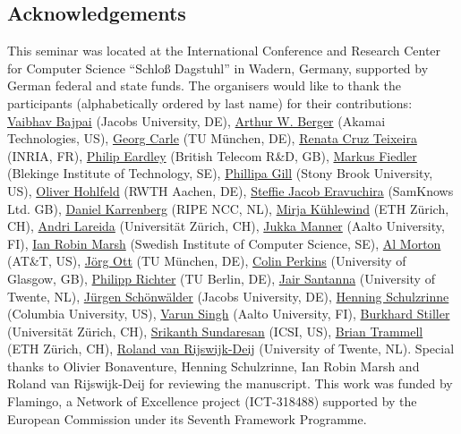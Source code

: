 \subsection*{Acknowledgements}\label{sec:acknowledgement}

This seminar was located at the International Conference and Research Center
for Computer Science ``Schloß Dagstuhl'' in Wadern, Germany, supported by German
federal and state funds. The organisers would like to thank the participants
(alphabetically ordered by last name) for their contributions:
\href{http://dblp.dagstuhl.de/rec/pid/17/11461}{Vaibhav Bajpai} (Jacobs University, DE),
\href{http://dblp.dagstuhl.de/rec/pid/46/4345}{Arthur W. Berger} (Akamai Technologies, US),
\href{http://dblp.dagstuhl.de/rec/pid/c/GeorgCarle}{Georg Carle} (TU München, DE),
\href{http://dblp.dagstuhl.de/rec/pid/64/4885}{Renata Cruz Teixeira} (INRIA, FR),
\href{http://dblp.dagstuhl.de/rec/pid/31/9324}{Philip Eardley} (British Telecom R\&D, GB),
\href{http://dblp.dagstuhl.de/rec/pid/48/4558}{Markus Fiedler} (Blekinge Institute of Technology, SE),
\href{http://dblp.dagstuhl.de/rec/pid/52/2893}{Phillipa Gill} (Stony Brook University, US),
\href{http://dblp.dagstuhl.de/rec/pid/75/6403}{Oliver Hohlfeld} (RWTH Aachen, DE),
\href{http://dblp.dagstuhl.de/rec/pid/165/2478}{Steffie Jacob Eravuchira} (SamKnows Ltd. GB),
\href{http://dblp.dagstuhl.de/rec/pid/85/3339}{Daniel Karrenberg} (RIPE NCC, NL),
\href{http://dblp.dagstuhl.de/rec/pid/50/8423}{Mirja Kühlewind} (ETH Zürich, CH),
\href{http://dblp.dagstuhl.de/rec/pid/133/3745}{Andri Lareida} (Universität Zürich, CH),
\href{http://dblp.dagstuhl.de/rec/pid/09/6049}{Jukka Manner} (Aalto University, FI),
\href{http://dblp.dagstuhl.de/rec/pid/00/1805}{Ian Robin Marsh} (Swedish Institute of Computer Science, SE),
\href{http://dblp.dagstuhl.de/rec/pid/84/7584}{Al Morton} (AT\&T, US),
\href{http://dblp.dagstuhl.de/rec/pid/57/6706}{Jörg Ott} (TU München, DE),
\href{http://dblp.dagstuhl.de/rec/pid/87/3859}{Colin Perkins} (University of Glasgow, GB),
\href{http://dblp.dagstuhl.de/rec/pid/01/7272}{Philipp Richter} (TU Berlin, DE),
\href{http://dblp.dagstuhl.de/rec/pid/147/3315}{Jair Santanna} (University of Twente, NL),
\href{http://dblp.dagstuhl.de/rec/pid/39/5680}{Jürgen Schönwälder} (Jacobs University, DE),
\href{http://dblp.dagstuhl.de/rec/pid/s/HenningSchulzrinne}{Henning Schulzrinne} (Columbia University, US),
\href{http://dblp.dagstuhl.de/rec/pid/39/5944}{Varun Singh} (Aalto University, FI),
\href{http://dblp.dagstuhl.de/rec/pid/00/4292}{Burkhard Stiller} (Universität Zürich, CH),
\href{http://dblp.dagstuhl.de/rec/pid/47/8093}{Srikanth Sundaresan} (ICSI, US),
\href{http://dblp.dagstuhl.de/rec/pid/56/5974}{Brian Trammell} (ETH Zürich, CH),
\href{http://dblp.dagstuhl.de/rec/pid/155/5773}{Roland van Rijswijk-Deij} (University of Twente, NL).
Special thanks to Olivier Bonaventure, Henning Schulzrinne, Ian Robin Marsh
and Roland van Rijswijk-Deij for reviewing the manuscript. This work was
funded by Flamingo, a Network of Excellence project (ICT-318488) supported by
the European Commission under its Seventh Framework Programme.

